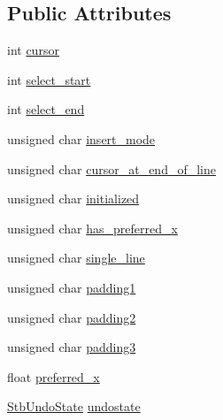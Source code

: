 \subsection*{Public Attributes}
\begin{DoxyCompactItemize}
\item 
int \mbox{\hyperlink{struct_im_gui_stb_1_1_s_t_b___textedit_state_a8656ac706fba8cc8cbcde46f18437c72}{cursor}}
\item 
int \mbox{\hyperlink{struct_im_gui_stb_1_1_s_t_b___textedit_state_ac3078352e3b28aeb7afcf08f113d9640}{select\+\_\+start}}
\item 
int \mbox{\hyperlink{struct_im_gui_stb_1_1_s_t_b___textedit_state_ab5bcff874696e23964ef779f4d19a07d}{select\+\_\+end}}
\item 
unsigned char \mbox{\hyperlink{struct_im_gui_stb_1_1_s_t_b___textedit_state_a1c918a228338ab3a1c0b640c3d98df93}{insert\+\_\+mode}}
\item 
unsigned char \mbox{\hyperlink{struct_im_gui_stb_1_1_s_t_b___textedit_state_ab4494b7f240ddb36f39ed841b341c7a3}{cursor\+\_\+at\+\_\+end\+\_\+of\+\_\+line}}
\item 
unsigned char \mbox{\hyperlink{struct_im_gui_stb_1_1_s_t_b___textedit_state_a88a83a49d1aecb9270a57bac07527b9b}{initialized}}
\item 
unsigned char \mbox{\hyperlink{struct_im_gui_stb_1_1_s_t_b___textedit_state_ac118037861698c8a0921012799707b68}{has\+\_\+preferred\+\_\+x}}
\item 
unsigned char \mbox{\hyperlink{struct_im_gui_stb_1_1_s_t_b___textedit_state_aa3bde2b0354fbdc2413dbc9a8aaef9c7}{single\+\_\+line}}
\item 
unsigned char \mbox{\hyperlink{struct_im_gui_stb_1_1_s_t_b___textedit_state_abd63300ec47cc0b4cb36e21537d2cc59}{padding1}}
\item 
unsigned char \mbox{\hyperlink{struct_im_gui_stb_1_1_s_t_b___textedit_state_aa6e2882bd1752493ba8acd000d247325}{padding2}}
\item 
unsigned char \mbox{\hyperlink{struct_im_gui_stb_1_1_s_t_b___textedit_state_a3ef1e2f20a9c518a786a0cf51b474828}{padding3}}
\item 
float \mbox{\hyperlink{struct_im_gui_stb_1_1_s_t_b___textedit_state_a69ad8390f04856d8833d2355d299e74a}{preferred\+\_\+x}}
\item 
\mbox{\hyperlink{struct_im_gui_stb_1_1_stb_undo_state}{Stb\+Undo\+State}} \mbox{\hyperlink{struct_im_gui_stb_1_1_s_t_b___textedit_state_aa53b0d0fcbe15632d67f42bc37e6888d}{undostate}}
\end{DoxyCompactItemize}



